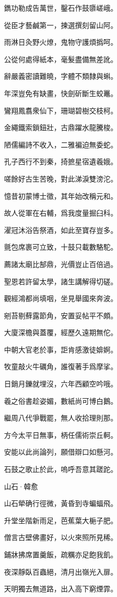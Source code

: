 \documentclass[12pt,a4paper]{ctexbook}
\begin{document}
鐫功勒成告萬世，鑿石作鼓隳嵯峨。\par
從臣才藝鹹第一，揀選撰刻留山阿。\par
雨淋日灸野火燎，鬼物守護煩撝呵。\par
公從何處得紙本，毫髮盡備無差訛。\par
辭嚴義密讀難曉，字體不類隸與蝌。\par
年深豈免有缺畫，快劍斫斷生蛟鼉。\par
鸞翔鳳翥衆仙下，珊瑚碧樹交枝柯。\par
金繩鐵索鎖鈕壯，古鼎躍水龍騰梭。\par
陋儒編詩不收入，二雅褊迫無委蛇。\par
孔子西行不到秦，掎摭星宿遺羲娥。\par
嗟餘好古生苦晚，對此涕淚雙滂沱。\par
憶昔初蒙博士徵，其年始改稱元和。\par
故人從軍在右輔，爲我度量掘臼科。\par
濯冠沐浴告祭酒，如此至寶存豈多。\par
氈包席裹可立致，十鼓只載數駱駝。\par
薦諸太廟比郜鼎，光價豈止百倍過。\par
聖恩若許留太學，諸生講解得切磋。\par
觀經鴻都尚填咽，坐見舉國來奔波。\par
剜苔剔蘚露節角，安置妥帖平不頗。\par
大廈深檐與蓋覆，經歷久遠期無佗。\par
中朝大官老於事，詎肯感激徒媕婀。\par
牧童敲火牛礪角，誰復著手爲摩挲。\par
日銷月鑠就埋沒，六年西顧空吟哦。\par
羲之俗書趁姿媚，數紙尚可博白鵝。\par
繼周八代爭戰罷，無人收拾理則那。\par
方今太平日無事，柄任儒術崇丘軻。\par
安能以此尚論列，願借辯口如懸河。\par
石鼓之歌止於此，嗚呼吾意其蹉跎。\par
山石·韓愈\par
山石犖确行徑微，黃昏到寺蝙蝠飛。\par
升堂坐階新雨足，芭蕉葉大梔子肥。\par
僧言古壁佛畫好，以火來照所見稀。\par
鋪牀拂席置羹飯，疏糲亦足飽我飢。\par
夜深靜臥百蟲絕，清月出嶺光入扉。\par
天明獨去無道路，出入高下窮煙霏。\par
\end{document}
